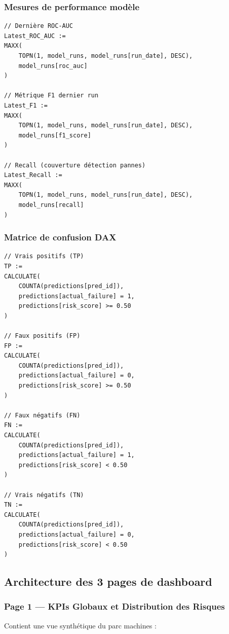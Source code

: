 \documentclass[a4paper,12pt]{report}
\begin{document}
\subsubsection{Mesures de performance modèle}

\begin{lstlisting}[language=DAX]
// Dernière ROC-AUC
Latest_ROC_AUC := 
MAXX(
    TOPN(1, model_runs, model_runs[run_date], DESC),
    model_runs[roc_auc]
)

// Métrique F1 dernier run
Latest_F1 := 
MAXX(
    TOPN(1, model_runs, model_runs[run_date], DESC),
    model_runs[f1_score]
)

// Recall (couverture détection pannes)
Latest_Recall := 
MAXX(
    TOPN(1, model_runs, model_runs[run_date], DESC),
    model_runs[recall]
)
\end{lstlisting}

\subsubsection{Matrice de confusion DAX}

\begin{lstlisting}[language=DAX]
// Vrais positifs (TP)
TP := 
CALCULATE(
    COUNTA(predictions[pred_id]),
    predictions[actual_failure] = 1,
    predictions[risk_score] >= 0.50
)

// Faux positifs (FP)
FP := 
CALCULATE(
    COUNTA(predictions[pred_id]),
    predictions[actual_failure] = 0,
    predictions[risk_score] >= 0.50
)

// Faux négatifs (FN)
FN := 
CALCULATE(
    COUNTA(predictions[pred_id]),
    predictions[actual_failure] = 1,
    predictions[risk_score] < 0.50
)

// Vrais négatifs (TN)
TN := 
CALCULATE(
    COUNTA(predictions[pred_id]),
    predictions[actual_failure] = 0,
    predictions[risk_score] < 0.50
)
\end{lstlisting}

\subsection{Architecture des 3 pages de dashboard}

\subsubsection{Page 1 — KPIs Globaux et Distribution des Risques}

Contient une vue synthétique du parc machines :
\end{document}
